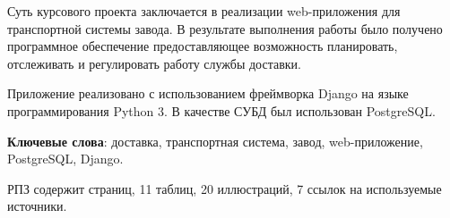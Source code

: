 Суть курсового проекта заключается в реализации web-приложения для транспортной системы завода. В результате выполнения работы было получено программное обеспечение предоставляющее возможность планировать, отслеживать и регулировать работу службы доставки.

Приложение реализовано с использованием фреймворка Django на языке программирования Python 3. В качестве СУБД был использован PostgreSQL.

\textbf{Ключевые слова}: доставка, транспортная система, завод, web-приложение, PostgreSQL, Django.

РПЗ содержит \pageref{lastpage} страниц, 
11 таблиц,
20 иллюстраций,
7 ссылок на используемые источники.
